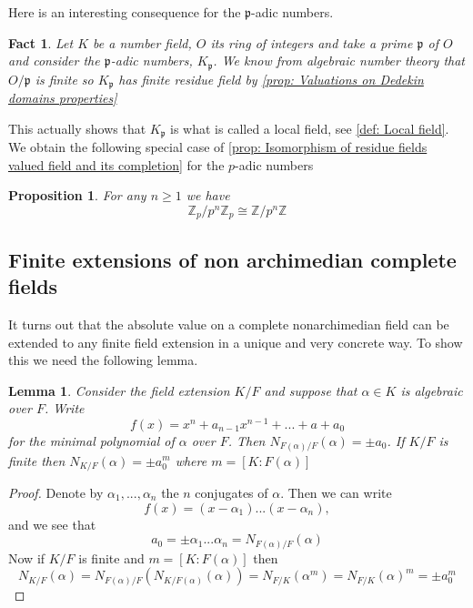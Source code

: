 \documentclass{article}
\newtheorem{proposition}{Proposition}[section]
\newtheorem{lemma}{Lemma}[section]
\newtheorem{fact}{Fact}[section]
\newcommand{\mfrak}[1]{\mathfrak{#1}}
\newcommand{\mbb}[1]{\mathbb{#1}}
\numberwithin{equation}{section}
\begin{document}
Here is an interesting consequence for the $\mfrak p$-adic numbers.
\begin{fact}\label{fact: The P-adic numbers is a local ring}
    Let $K$ be a number field, $O$ its ring of integers and take a prime $\mfrak p$ of $O$ and consider the $\mfrak p$-adic numbers, $K_\mfrak p$. We know from algebraic number theory that $O / \mfrak p$ is finite so $K_\mfrak p$ has finite residue field by \cref{prop: Valuations on Dedekin domains properties}
\end{fact}
This actually shows that $K_\mfrak p$ is what is called a local field, see \cref{def: Local field}. We obtain the following special case of \cref{prop: Isomorphism of residue fields valued field and its completion} for the $p$-adic numbers
\begin{proposition}\label{prop: Isomorphism of residue fields valued field and its completion special case}
    For any $n \geq 1$ we have
    $$\mbb Z_p / p^n \mbb Z_p \cong \mbb Z / p^n \mbb Z$$
\end{proposition}


\subsection{Finite extensions of non archimedian complete fields}

It turns out that the absolute value on a complete nonarchimedian field can be extended to any finite field extension in a unique and very concrete way. To show this we need the following lemma.

\begin{lemma}\label{lem: norm of algebraic number is pm 0th coefficient}
    Consider the field extension $K / F$ and suppose that $\alpha \in K$ is algebraic over $F$. Write
    $$f(x) = x^n + a_{n-1} x^{n-1} + ... + a+a_0$$
    for the minimal polynomial of $\alpha$ over $F$. Then $N_{F(\alpha)/F} (\alpha) = \pm a_0$. If $K / F$ is finite then $N_{K / F}(\alpha) = \pm a_0^m$
    where $m = [K : F(\alpha)]$
\end{lemma}
\begin{proof}
    Denote by $\alpha_1, ..., \alpha_n$ the $n$ conjugates of $\alpha$. Then we can write
    $$f(x) = (x-\alpha_1)...(x-\alpha_n),$$
    and we see that
    $$a_0 = \pm \alpha_1 ... \alpha_n = N_{F(\alpha) / F}(\alpha)$$
    Now if $K/F$ is finite and $m = [K : F(\alpha)]$ then
    $$N_{K / F}(\alpha) = N_{F(\alpha) / F}(N_{K / F(\alpha)}(\alpha)) = N_{F / K}(\alpha^m) = N_{F / K}(\alpha)^m = \pm a_0^m$$
\end{proof}
\end{document}
